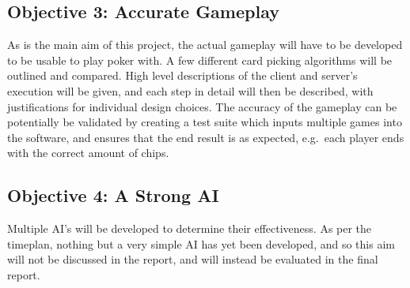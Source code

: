 \subsection{Objective 3: Accurate Gameplay}
As is the main aim of this project, the actual gameplay will have to be
developed to be usable to play poker with. A few different card picking
algorithms will be outlined and compared. High level descriptions of the
client and server's execution will be given, and each step in detail will
then be described, with justifications for individual design choices. The
accuracy of the gameplay can be potentially be validated by creating a test
suite which inputs multiple games into the software, and ensures that the
end result is as expected, e.g.\ each player ends with the correct amount of
chips.

\subsection{Objective 4: A Strong AI}
Multiple AI's will be developed to determine their effectiveness. As per the
timeplan, nothing but a very simple AI has yet been developed, and so this
aim will not be discussed in the report, and will instead be evaluated in the
final report.
